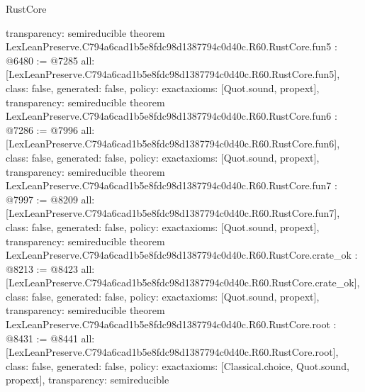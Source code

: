 \begin{lexlean}{RustCore}
\begin{coremodule}
{  transparency: semireducible
}
theorem LexLeanPreserve.C794a6cad1b5e8fdc98d1387794c0d40c.R60.RustCore.fun5 : @6480 := @7285 {
  all: [LexLeanPreserve.C794a6cad1b5e8fdc98d1387794c0d40c.R60.RustCore.fun5],
  class: false,
  generated: false,
  policy: exact{axioms: [Quot.sound, propext]},
  transparency: semireducible
}
theorem LexLeanPreserve.C794a6cad1b5e8fdc98d1387794c0d40c.R60.RustCore.fun6 : @7286 := @7996 {
  all: [LexLeanPreserve.C794a6cad1b5e8fdc98d1387794c0d40c.R60.RustCore.fun6],
  class: false,
  generated: false,
  policy: exact{axioms: [Quot.sound, propext]},
  transparency: semireducible
}
theorem LexLeanPreserve.C794a6cad1b5e8fdc98d1387794c0d40c.R60.RustCore.fun7 : @7997 := @8209 {
  all: [LexLeanPreserve.C794a6cad1b5e8fdc98d1387794c0d40c.R60.RustCore.fun7],
  class: false,
  generated: false,
  policy: exact{axioms: [Quot.sound, propext]},
  transparency: semireducible
}
theorem LexLeanPreserve.C794a6cad1b5e8fdc98d1387794c0d40c.R60.RustCore.crate_ok : @8213 := @8423 {
  all: [LexLeanPreserve.C794a6cad1b5e8fdc98d1387794c0d40c.R60.RustCore.crate_ok],
  class: false,
  generated: false,
  policy: exact{axioms: [Quot.sound, propext]},
  transparency: semireducible
}
theorem LexLeanPreserve.C794a6cad1b5e8fdc98d1387794c0d40c.R60.RustCore.root : @8431 := @8441 {
  all: [LexLeanPreserve.C794a6cad1b5e8fdc98d1387794c0d40c.R60.RustCore.root],
  class: false,
  generated: false,
  policy: exact{axioms: [Classical.choice, Quot.sound, propext]},
  transparency: semireducible
}


\end{coremodule}
\end{lexlean}
